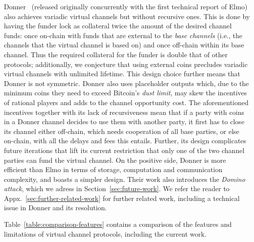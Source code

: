   Donner~\cite{donner}
    (released originally concurrently with the first technical report of Elmo) 
also achieves variadic
  virtual channels but without recursive ones. This is
  done by having the funder lock as
  collateral twice the amount of the desired channel funds: once on-chain with
  funds that are external to the \emph{base channels} (i.e., the channels that the
  virtual channel is based on) and once off-chain within its base channel. Thus
  the required collateral for the funder is double that of other protocols;
  additionally, we conjecture that using external coins precludes variadic
  virtual channels with unlimited lifetime. This
  design choice further means that Donner is not symmetric. Donner also uses
  placeholder outputs which, due to the minimum coins they need to
  exceed Bitcoin's \emph{dust limit}, may skew the incentives of rational players
  and adds to the channel
  opportunity cost. The aforementioned incentives
  together with its lack of recursiveness mean that if a party with coins in a
  Donner channel decides to use them with another party, it first has to close
  its channel either off-chain, which needs cooperation of all base parties, or
  else on-chain, with all the delays and fees this entails.
  Further, its design complicates
  future iterations that lift its current restriction that only one of the two
  channel parties can fund the virtual channel. On the positive side, Donner is
  more efficient than Elmo in terms of storage, computation and communication
  complexity, and boasts a simpler design. 
  Their work also introduces the \emph{Domino attack},
  which we adress in Section~\ref{sec:future-work}.
  We refer the reader to Appx.~\ref{sec:further-related-work} for further
  related work, including a technical issue in Donner and its resolution.

  Table~\ref{table:comparison-features} contains a comparison of the
  features and limitations of virtual channel protocols, including the current
  work.
